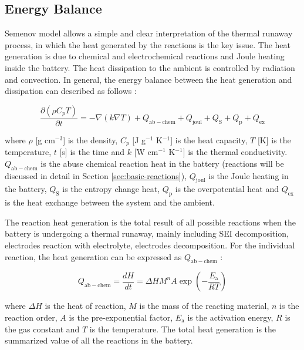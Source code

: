\subsection{Energy Balance}
\label{sec:energy-balance}
Semenov model allows a simple and clear interpretation of the thermal runaway process, in which the heat generated by the reactions is the key issue. The heat generation is due to chemical and electrochemical reactions and Joule heating inside the battery. The heat dissipation to the ambient is controlled by radiation and convection. In general, the energy balance between the heat generation and dissipation can described as follows \cite{wang2012thermal,torabi2011study}:

\begin{equation}
    \label{eq:energy-balance}
    \frac{\partial\left(\rho C_p T\right)}{\partial t}=-\nabla(k \nabla T)+Q_{\mathrm{ab}-\text{chem}}+Q_{\text{joul}}+Q_{\mathrm{S}}+Q_{\mathrm{p}}+Q_{\mathrm{ex}}
\end{equation}

where $\rho$ [g cm$^{-3}$] is the density, $C_p$ [J g$^{-1}$ K$^{-1}$] is the  heat capacity, $T$ [K] is the temperature, $t$ [s] is the time and $k$ [W cm$^{-1}$ K$^{-1}$] is the thermal conductivity. $Q_{\mathrm{ab}-\text{chem}}$ is the abuse chemical reaction heat in the battery (reactions will be discussed in detail in Section \ref{sec:basic-reactions}), $Q_{\text{joul}}$ is the Joule heating in the battery, $Q_{\mathrm{S}}$ is the entropy change heat, $Q_{\mathrm{p}}$ is the overpotential heat and $Q_{\mathrm{ex}}$ is the heat exchange between the system and the ambient.

The reaction heat generation is the total result of all possible reactions when the battery is undergoing a thermal runaway, mainly including SEI decomposition, electrodes reaction with electrolyte, electrodes decomposition. For the individual reaction, the heat generation can be expressed as $Q_{\mathrm{ab}-\text{chem}}$ \cite{wang2010catastrophe}:

\begin{equation}
    \label{eq:heat-generation}
    Q_{\mathrm{ab}-\text{chem}}=\frac{d H}{d t}=\Delta H M^n A \exp \left(-\frac{E_{\mathrm{a}}}{R T}\right)
\end{equation}

where $\Delta H$ is the heat of reaction, $M$ is the mass of the reacting material, $n$ is the reaction order, $A$ is the pre-exponential factor, $E_{\mathrm{a}}$ is the activation energy, $R$ is the gas constant and $T$ is the temperature. The total heat generation is the summarized value of all the reactions in the battery.

